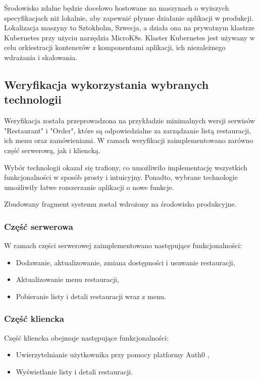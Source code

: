 Środowisko zdalne będzie docelowo hostowane na maszynach o wyższych specyfikacjach niż lokalnie, aby zapewnić płynne działanie aplikacji w produkcji. Lokalizacja maszyny to Sztokholm, Szwecja, a działa ona na prywatnym klastrze Kubernetes przy użyciu narzędzia MicroK8s. Klaster Kubernetes jest używany w celu orkiestracji kontenerów z komponentami aplikacji, ich niezależnego wdrażania i skalowania.

\subsection{Weryfikacja wykorzystania wybranych technologii}

Weryfikacja została przeprowadzona na przykładzie minimalnych wersji serwisów "Restaurant" i "Order", które są odpowiedzialne za zarządzanie listą restauracji, ich menu oraz zamówieniami. W ramach weryfikacji zaimplementowano zarówno część serwerową, jak i kliencką.

Wybór technologii okazał się trafiony, co umożliwiło implementację wszystkich funkcjonalności w sposób prosty i intuicyjny. Ponadto, wybrane technologie umożliwiły łatwe rozszerzanie aplikacji o nowe funkcje.

Zbudowany fragment systemu został wdrożony na środowisko produkcyjne.

\subsubsection{Część serwerowa}

W ramach części serwerowej zaimplementowano następujące funkcjonalności:

\begin{itemize}
    \item Dodawanie, aktualizowanie, zmiana dostępności i usuwanie restauracji,
    \item Aktualizowanie menu restauracji,
    \item Pobieranie listy i detali restauracji wraz z menu.
\end{itemize}

\subsubsection{Część kliencka}

Część kliencka obejmuje następujące funkcjonalności:

\begin{itemize}
    \item Uwierzytelnianie użytkownika przy pomocy platformy Auth0 \cite{auth0},
    \item Wyświetlanie listy i detali restauracji.
\end{itemize}

